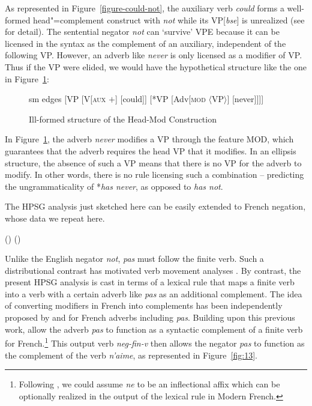 \documentclass[output=paper
                ,modfonts
		,nonflat
	        ,collection
	        ,collectionchapter
	        ,collectiontoclongg
 	        ,biblatex  
                ,babelshorthands
                ,newtxmath
                ,draftmode
                ,colorlinks, citecolor=brown 
]{./langsci/langscibook}
\begin{document}
{\begin{exe}
\begin{xlist}
\begin{exe}
\begin{xlist}
As represented in Figure~\ref{figure-could-not}, the auxiliary verb \emph{could} forms a well-formed head"=complement construct with \emph{not} while its
VP[\emph{bse}] is unrealized (see \citep{Kim:00, KS:08} for
detail). The sentential negator \emph{not} can `survive' VPE because it can be
licensed in the syntax as the complement of an auxiliary, independent
of the following VP.  However, an adverb like \emph{never} is only
licensed as a modifier of VP. Thus if the VP were elided, we would have the hypothetical
structure like the one in Figure~\ref{fig-could-never}:
\begin{figure}
	\begin{forest}
		sm edges
		[VP
			[V{[\textsc{aux $+$}]}
				[could]]
			[*VP
				[Adv{[\textsc{mod} $\langle$VP$\rangle$]}
					[never]]]]
	\end{forest}
\caption{Ill-formed structure of the Head-Mod Construction}\label{fig-could-never}
\end{figure}
In Figure~\ref{fig-could-never}, the adverb \emph{never} modifies a VP through the feature MOD,
which guarantees that the adverb requires the head VP that it
modifies. In an ellipsis structure, the absence of such a VP means
that there is no VP for the adverb to modify.  In other words, there
is no rule licensing such a combination -- predicting the
ungrammaticality of *\emph{has never},  as opposed to \emph{has not}.


The HPSG analysis just sketched here can be easily extended to French negation, whose
data we repeat here. 

\eal
{} (\label{56a})
(\label{56b})
\zl

\noindent
Unlike the English negator \emph{not}, \emph{pas} must follow the
finite verb. Such a distributional contrast has motivated verb
movement analyses \citep[see][]{Pollock:89,Zanuttini:01}.
By contrast, the present HPSG analysis is cast
in terms of a lexical rule that maps a finite verb into a verb
with a certain adverb like \emph{pas} as an additional complement.
 The idea of converting modifiers in French into
complements has been independently proposed by \citet{Miller92d-u} and
\citet{AG:94} for French adverbs including
\emph{pas}.  Building upon this
previous work, \citet{AG:97, Kim:00} 
allow the adverb \emph{pas} to function 
as a syntactic complement of a
finite verb for French.\footnote{Following \citet{AG:94},
we could assume \emph{ne} to
be an inflectional affix which can be optionally realized
in the output of the lexical rule in Modern French.}
This output verb \emph{neg-fin-v} then allows the negator \emph{pas} to function
as the complement of the verb \emph{n'aime}, as represented in Figure~\ref{fig:13}.


\end{xlist}
\end{exe}
\end{xlist}
\end{exe}}
\end{document}
